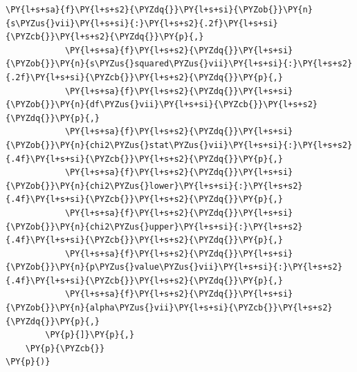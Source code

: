 \begin{tcolorbox}[breakable, size=fbox, boxrule=1pt, pad at break*=1mm,colback=cellbackground, colframe=cellborder]
\begin{Verbatim}[commandchars=\\\{\}]
            \PY{l+s+sa}{f}\PY{l+s+s2}{\PYZdq{}}\PY{l+s+si}{\PYZob{}}\PY{n}{s\PYZus{}vii}\PY{l+s+si}{:}\PY{l+s+s2}{.2f}\PY{l+s+si}{\PYZcb{}}\PY{l+s+s2}{\PYZdq{}}\PY{p}{,}
            \PY{l+s+sa}{f}\PY{l+s+s2}{\PYZdq{}}\PY{l+s+si}{\PYZob{}}\PY{n}{s\PYZus{}squared\PYZus{}vii}\PY{l+s+si}{:}\PY{l+s+s2}{.2f}\PY{l+s+si}{\PYZcb{}}\PY{l+s+s2}{\PYZdq{}}\PY{p}{,}
            \PY{l+s+sa}{f}\PY{l+s+s2}{\PYZdq{}}\PY{l+s+si}{\PYZob{}}\PY{n}{df\PYZus{}vii}\PY{l+s+si}{\PYZcb{}}\PY{l+s+s2}{\PYZdq{}}\PY{p}{,}
            \PY{l+s+sa}{f}\PY{l+s+s2}{\PYZdq{}}\PY{l+s+si}{\PYZob{}}\PY{n}{chi2\PYZus{}stat\PYZus{}vii}\PY{l+s+si}{:}\PY{l+s+s2}{.4f}\PY{l+s+si}{\PYZcb{}}\PY{l+s+s2}{\PYZdq{}}\PY{p}{,}
            \PY{l+s+sa}{f}\PY{l+s+s2}{\PYZdq{}}\PY{l+s+si}{\PYZob{}}\PY{n}{chi2\PYZus{}lower}\PY{l+s+si}{:}\PY{l+s+s2}{.4f}\PY{l+s+si}{\PYZcb{}}\PY{l+s+s2}{\PYZdq{}}\PY{p}{,}
            \PY{l+s+sa}{f}\PY{l+s+s2}{\PYZdq{}}\PY{l+s+si}{\PYZob{}}\PY{n}{chi2\PYZus{}upper}\PY{l+s+si}{:}\PY{l+s+s2}{.4f}\PY{l+s+si}{\PYZcb{}}\PY{l+s+s2}{\PYZdq{}}\PY{p}{,}
            \PY{l+s+sa}{f}\PY{l+s+s2}{\PYZdq{}}\PY{l+s+si}{\PYZob{}}\PY{n}{p\PYZus{}value\PYZus{}vii}\PY{l+s+si}{:}\PY{l+s+s2}{.4f}\PY{l+s+si}{\PYZcb{}}\PY{l+s+s2}{\PYZdq{}}\PY{p}{,}
            \PY{l+s+sa}{f}\PY{l+s+s2}{\PYZdq{}}\PY{l+s+si}{\PYZob{}}\PY{n}{alpha\PYZus{}vii}\PY{l+s+si}{\PYZcb{}}\PY{l+s+s2}{\PYZdq{}}\PY{p}{,}
        \PY{p}{]}\PY{p}{,}
    \PY{p}{\PYZcb{}}
\PY{p}{)}
\end{Verbatim}
\end{tcolorbox}

